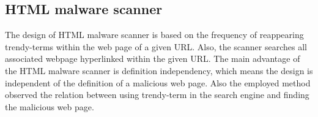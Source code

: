 \subsection{HTML malware scanner}

The design of HTML malware scanner is based on the frequency of reappearing trendy-terms within the web page of a given URL. Also, the scanner searches all associated webpage hyperlinked within the given URL. The main advantage of the HTML malware scanner is definition independency, which means the design is independent of the definition of a malicious web page. Also the employed method observed the relation between using trendy-term in the search engine and finding the malicious web page.
